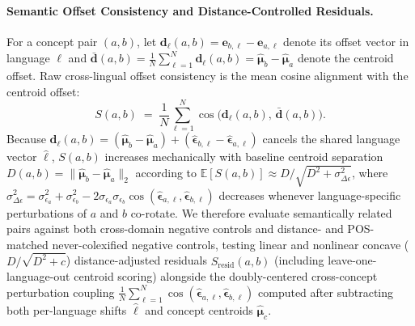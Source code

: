 \paragraph{Semantic Offset Consistency and Distance-Controlled Residuals.}
For a concept pair $(a, b)$, let $\mathbf{d}_{\ell}(a,b) = \mathbf{e}_{b,\ell} - \mathbf{e}_{a,\ell}$ denote its offset vector in language $\ell$ and $\bar{\mathbf{d}}(a,b) = \frac{1}{N}\sum_{\ell=1}^{N}\mathbf{d}_{\ell}(a,b) = \hat{\boldsymbol{\mu}}_b - \hat{\boldsymbol{\mu}}_a$ denote the centroid offset.
Raw cross-lingual offset consistency is the mean cosine alignment with the centroid offset:
\begin{equation}
S(a, b) \;=\; \frac{1}{N}\sum_{\ell=1}^{N} \cos\!\big(\mathbf{d}_{\ell}(a,b),\, \bar{\mathbf{d}}(a,b)\big).
\label{eq:offset}
\end{equation}
Because $\mathbf{d}_{\ell}(a,b) = (\hat{\boldsymbol{\mu}}_b - \hat{\boldsymbol{\mu}}_a) + (\hat{\boldsymbol{\epsilon}}_{b,\ell} - \hat{\boldsymbol{\epsilon}}_{a,\ell})$ cancels the shared language vector $\hat{\boldsymbol{\ell}}$, $S(a,b)$ increases mechanically with baseline centroid separation $D(a,b) = \|\hat{\boldsymbol{\mu}}_b - \hat{\boldsymbol{\mu}}_a\|_2$ according to $\mathbb{E}[S(a,b)] \approx D / \sqrt{D^2 + \sigma_{\Delta\epsilon}^2}$, where $\sigma_{\Delta\epsilon}^2 = \sigma_{\epsilon_a}^2 + \sigma_{\epsilon_b}^2 - 2\sigma_{\epsilon_a}\sigma_{\epsilon_b}\cos(\hat{\boldsymbol{\epsilon}}_{a,\ell}, \hat{\boldsymbol{\epsilon}}_{b,\ell})$ decreases whenever language-specific perturbations of $a$ and $b$ co-rotate.
We therefore evaluate \OffsetSemanticCount{} semantically related pairs against both \OffsetControlCount{} cross-domain negative controls and \OffsetMatchedCount{} distance- and POS-matched never-colexified negative controls, testing linear and nonlinear concave ($D/\sqrt{D^2+c}$) distance-adjusted residuals $S_{\text{resid}}(a,b)$ (including leave-one-language-out centroid scoring) alongside the doubly-centered cross-concept perturbation coupling $\frac{1}{N}\sum_{\ell=1}^{N}\cos(\hat{\boldsymbol{\epsilon}}_{a,\ell}, \hat{\boldsymbol{\epsilon}}_{b,\ell})$ computed after subtracting both per-language shifts $\hat{\boldsymbol{\ell}}$ and concept centroids $\hat{\boldsymbol{\mu}}_c$.
